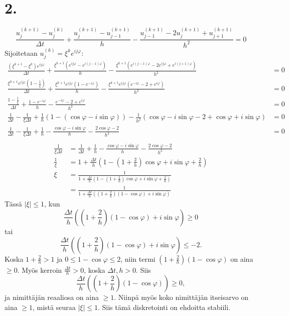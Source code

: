 \documentclass{article}
\begin{document}
\newpage
\section*{2.}

\[
  \frac{u_j^{(k+1)} - u_j^{(k)}}{\Delta t} + \frac{u_j^{(k+1)} - u_{j-1}^{(k+1)}}{h}
  - \frac{u_{j-1}^{(k+1)} - 2u_j^{(k+1)} + u_{j+1}^{(k+1)}}{h^2} = 0
\]
Sijoitetaan $u_j^{(k)} = \xi^k e^{ij\varphi}$:
\begin{align*}
  \frac{(\xi^{k+1} - \xi^k)e^{ij\varphi}}{\Delta t}
  + \frac{\xi^{k+1}(e^{ij\varphi} - e^{i(j-1)\varphi})}{h}
  - \frac{\xi^{k+1}(e^{i(j-1)\varphi} - 2e^{ij\varphi} + e^{i(j+1)\varphi})}{h^2} &= 0 \\
  \frac{\xi^{k+1}e^{ij\varphi}(1 - \frac{1}{\xi})}{\Delta t}
  + \frac{\xi^{k+1}e^{ij\varphi}(1 - e^{-i\varphi})}{h}
  - \frac{\xi^{k+1}e^{ij\varphi}(e^{-i\varphi} - 2 + e^{i\varphi})}{h^2} &= 0 \\
  \frac{1 - \frac{1}{\xi}}{\Delta t} + \frac{1 - e^{-i\varphi}}{h}
  - \frac{e^{-i\varphi} - 2 + e^{i\varphi}}{h^2} &= 0 \\
  \frac{1}{\Delta t} - \frac{1}{\xi\Delta t}
  + \frac{1}{h}(1 - (\cos\varphi - i\sin\varphi))
  - \frac{1}{h^2}(\cos\varphi - i\sin\varphi - 2 + \cos\varphi + i\sin\varphi) &= 0 \\
  \frac{1}{\Delta t} - \frac{1}{\xi\Delta t}
  + \frac{1}{h} - \frac{\cos\varphi - i\sin\varphi}{h}
  - \frac{2\cos\varphi - 2}{h^2} &= 0 \\
\end{align*}
\begin{align*}
  \frac{1}{\xi\Delta t} &= \frac{1}{\Delta t} + \frac{1}{h}
  - \frac{\cos\varphi - i\sin\varphi}{h} - \frac{2\cos\varphi - 2}{h^2} \\
  \frac{1}{\xi} &= 1 + \frac{\Delta t}{h} (1 - (1 + \frac{2}{h})\cos\varphi + i\sin\varphi + \frac{2}{h}) \\
  \xi &= \frac{1}{1 + \frac{\Delta t}{h} (1 - (1 + \frac{2}{h})\cos\varphi + i\sin\varphi + \frac{2}{h})} \\
      &= \frac{1}{1 + \frac{\Delta t}{h} ((1 + \frac{2}{h})(1 - \cos\varphi) + i\sin\varphi)}
\end{align*}
Tässä $|\xi| \leq 1$, kun
\[
  \frac{\Delta t}{h} ((1 + \frac{2}{h})(1 - \cos\varphi) + i\sin\varphi) \geq 0
\]
tai
\[
  \frac{\Delta t}{h} ((1 + \frac{2}{h})(1 - \cos\varphi) + i\sin\varphi) \leq -2.
\]
Koska $1 + \frac{2}{h} > 1$ ja $0 \leq 1 - \cos\varphi \leq 2$, niin termi
$(1 + \frac{2}{h})(1 - \cos\varphi)$ on aina $\geq 0$.
Myös kerroin $\frac{\Delta t}{h} > 0$, koska $\Delta t, h > 0$.
Siis
\[
  \frac{\Delta t}{h}((1 + \frac{2}{h})(1 - \cos\varphi)) \geq 0,
\]
ja nimittäjän reaaliosa on aina $\geq 1$. Niinpä myös koko nimittäjän
itseisarvo on aina $\geq 1$, mistä seuraa $|\xi| \leq 1$.
Siis tämä diskretointi on ehdoitta stabiili.
\end{document}
